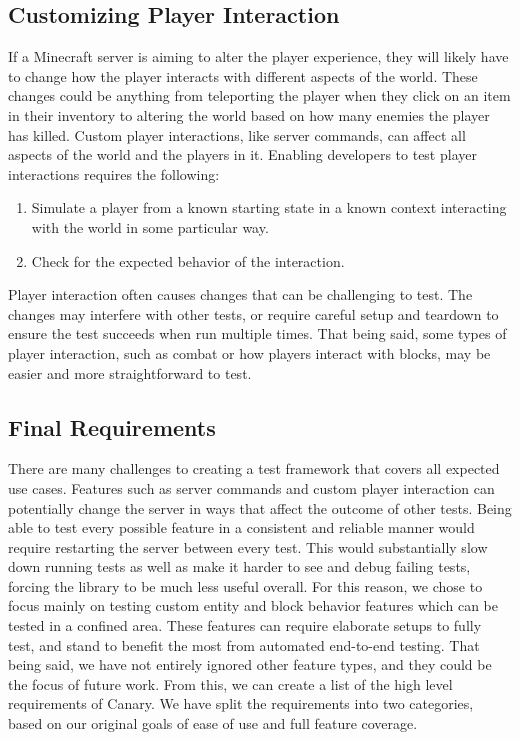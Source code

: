 \documentclass[12pt]{article}
\begin{document}
\begin{onehalfspacing}
\subsection{Customizing Player Interaction}

If a Minecraft server is aiming to alter the player experience, they
will likely have to change how the player interacts with different
aspects of the world. These changes could be anything from teleporting
the player when they click on an item in their inventory to altering the
world based on how many enemies the player has killed. Custom player
interactions, like server commands, can affect all aspects of the world
and the players in it. Enabling developers to test player interactions
requires the following:

\begin{enumerate}
\item
  Simulate a player from a known starting state in a known context
  interacting with the world in some particular way.
\item
  Check for the expected behavior of the interaction.
\end{enumerate}

Player interaction often causes changes that can be challenging to test.
The changes may interfere with other tests, or require careful setup and
teardown to ensure the test succeeds when run multiple times. That being
said, some types of player interaction, such as combat or how players
interact with blocks, may be easier and more straightforward to test.

\subsection{Final Requirements}

There are many challenges to creating a test framework that covers all
expected use cases. Features such as server commands and custom player
interaction can potentially change the server in ways that affect the
outcome of other tests. Being able to test every possible feature in a
consistent and reliable manner would require restarting the server
between every test. This would substantially slow down running tests as
well as make it harder to see and debug failing tests, forcing the
library to be much less useful overall. For this reason, we chose to
focus mainly on testing custom entity and block behavior features which
can be tested in a confined area. These features can require elaborate
setups to fully test, and stand to benefit the most from automated
end-to-end testing. That being said, we have not entirely ignored other
feature types, and they could be the focus of future work. From this, we
can create a list of the high level requirements of Canary. We have
split the requirements into two categories, based on our original goals
of ease of use and full feature coverage.


\end{onehalfspacing}
\end{document}
